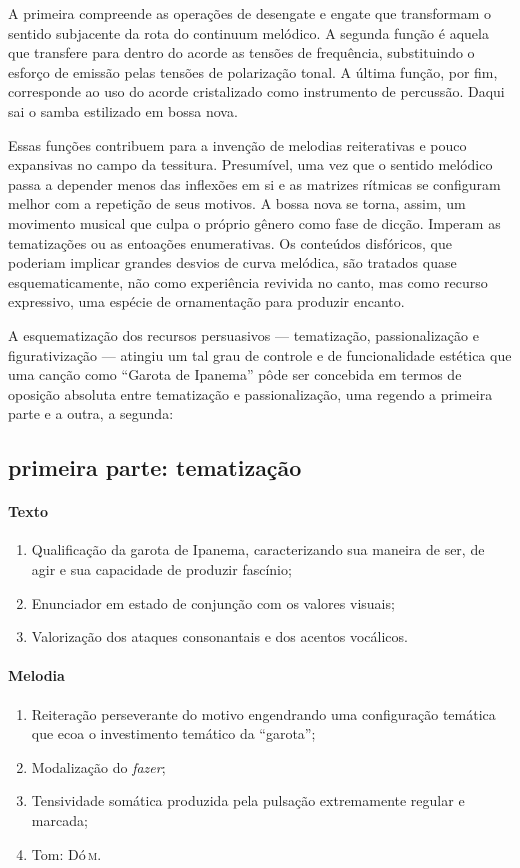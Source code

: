 A primeira compreende as operações de desengate e engate que transformam
o sentido subjacente da rota do continuum melódico. A segunda função é
aquela que transfere para dentro do acorde as tensões de frequência,
substituindo o esforço de emissão pelas tensões de polarização tonal. A
última função, por fim, corresponde ao uso do acorde cristalizado como
instrumento de percussão. Daqui sai o samba estilizado em bossa nova.

Essas funções contribuem para a invenção de melodias reiterativas e
pouco expansivas no campo da tessitura. Presumível, uma vez que o
sentido melódico passa a depender menos das inflexões em si e as
matrizes rítmicas se configuram melhor com a repetição de seus motivos.
A bossa nova se torna, assim, um movimento musical que culpa o próprio
gênero como fase de dicção. Imperam as tematizações ou as entoações
enumerativas. Os conteúdos disfóricos, que poderiam implicar grandes
desvios de curva melódica, são tratados quase esquematicamente, não como
experiência revivida no canto, mas como recurso expressivo, uma espécie
de ornamentação para produzir encanto.

A esquematização dos recursos persuasivos --- tematização, passionalização
e figurativização --- atingiu um tal grau de controle e de funcionalidade
estética que uma canção como ``Garota de Ipanema'' pôde ser concebida em
termos de oposição absoluta entre tematização e passionalização, uma
regendo a primeira parte e a outra, a segunda:

\subsection{primeira parte: tematização}


\paragraph{Texto} 
\begin{enumerate}
\item Qualificação da garota de Ipanema, caracterizando sua maneira de ser, de
agir e sua capacidade de produzir fascínio;
\item Enunciador em estado de conjunção com os valores visuais;
\item Valorização dos ataques consonantais e dos acentos vocálicos.
\end{enumerate}

\paragraph{Melodia}
\begin{enumerate}
\item Reiteração perseverante do motivo engendrando uma configuração temática
que ecoa o investimento temático da ``garota'';
\item Modalização do \textit{fazer};
\item Tensividade somática produzida pela pulsação extremamente regular e
marcada;
\item Tom: Dó\,\textsc{m}.
\end{enumerate}

